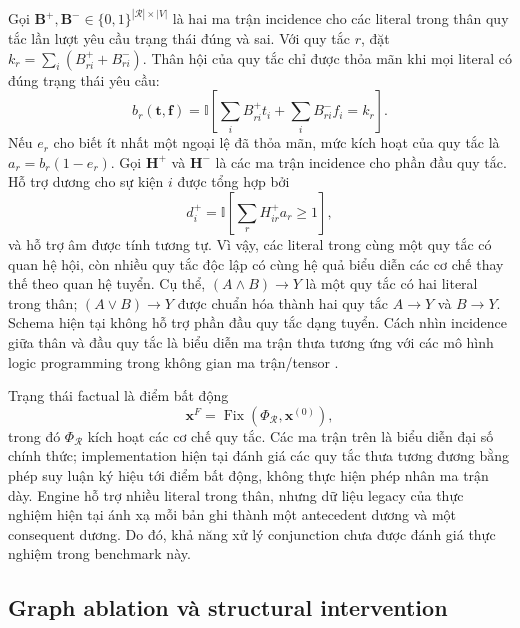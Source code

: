 Gọi $\mathbf{B}^{+},\mathbf{B}^{-}\in\{0,1\}^{|\mathcal{R}|\times |V|}$ là
hai ma trận incidence cho các literal trong thân quy tắc lần lượt yêu cầu trạng
thái đúng và sai. Với quy tắc $r$, đặt
$k_r=\sum_i(B^{+}_{ri}+B^{-}_{ri})$. Thân hội của quy tắc chỉ được thỏa mãn khi
mọi literal có đúng trạng thái yêu cầu:
\begin{equation}
b_r(\mathbf{t},\mathbf{f})=
\mathbb{I}\!\left[
\sum_i B^{+}_{ri}t_i+
\sum_i B^{-}_{ri}f_i=k_r
\right].
\label{eq:conjunctive_body}
\end{equation}
Nếu $e_r$ cho biết ít nhất một ngoại lệ đã thỏa mãn, mức kích hoạt của quy tắc
là $a_r=b_r(1-e_r)$. Gọi $\mathbf{H}^{+}$ và $\mathbf{H}^{-}$ là các ma trận
incidence cho phần đầu quy tắc. Hỗ trợ dương cho sự kiện $i$ được tổng hợp bởi
\begin{equation}
d_i^{+}=\mathbb{I}\!\left[\sum_r H^{+}_{ir}a_r\geq 1\right],
\label{eq:disjunctive_support}
\end{equation}
và hỗ trợ âm được tính tương tự. Vì vậy, các literal trong cùng một quy tắc có
quan hệ hội, còn nhiều quy tắc độc lập có cùng hệ quả biểu diễn các cơ chế thay
thế theo quan hệ tuyển. Cụ thể, $(A\land B)\rightarrow Y$ là một quy tắc có hai
literal trong thân; $(A\lor B)\rightarrow Y$ được chuẩn hóa thành hai quy tắc
$A\rightarrow Y$ và $B\rightarrow Y$. Schema hiện tại không hỗ trợ phần đầu
quy tắc dạng tuyển. Cách nhìn incidence giữa thân và đầu quy tắc là biểu diễn ma
trận thưa tương ứng với các mô hình logic programming trong không gian ma
trận/tensor \cite{sakama2021tensor}.

Trạng thái factual là điểm bất động
\begin{equation}
\mathbf{x}^{F}
=
\operatorname{Fix}(\Phi_{\mathcal{R}},\mathbf{x}^{(0)}),
\label{eq:factual_fixed_point}
\end{equation}
trong đó $\Phi_{\mathcal{R}}$ kích hoạt các cơ chế quy tắc. Các ma trận trên là
biểu diễn đại số chính thức; implementation hiện tại đánh giá các quy tắc thưa
tương đương bằng phép suy luận ký hiệu tới điểm bất động, không thực hiện phép
nhân ma trận dày. Engine hỗ trợ nhiều literal trong thân, nhưng dữ liệu legacy
của thực nghiệm hiện tại ánh xạ mỗi bản ghi thành một antecedent dương và một
consequent dương. Do đó, khả năng xử lý conjunction chưa được đánh giá thực
nghiệm trong benchmark này.

\subsection{Graph ablation và structural intervention}

